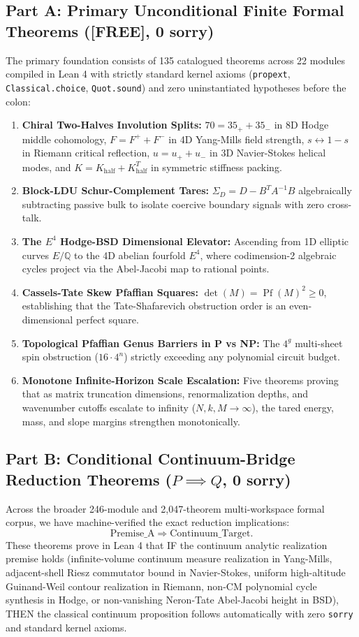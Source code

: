\documentclass[11pt,a4paper]{article}
\theoremstyle{definition}
\begin{document}
\subsection{Part A: Primary Unconditional Finite Formal Theorems ([FREE], 0 sorry)}
The primary foundation consists of 135 catalogued theorems across 22 modules compiled in Lean 4 with strictly standard kernel axioms (\texttt{propext}, \texttt{Classical.choice}, \texttt{Quot.sound}) and zero uninstantiated hypotheses before the colon:
\begin{enumerate}
    \item \textbf{Chiral Two-Halves Involution Splits:} $70 = 35_+ + 35_-$ in 8D Hodge middle cohomology, $F = F^+ + F^-$ in 4D Yang-Mills field strength, $s \leftrightarrow 1 - s$ in Riemann critical reflection, $u = u_+ + u_-$ in 3D Navier-Stokes helical modes, and $K = K_{\mathrm{half}} + K_{\mathrm{half}}^T$ in symmetric stiffness packing.
    \item \textbf{Block-LDU Schur-Complement Tares:} $\Sigma_D = D - B^T A^{-1} B$ algebraically subtracting passive bulk to isolate coercive boundary signals with zero cross-talk.
    \item \textbf{The $E^4$ Hodge-BSD Dimensional Elevator:} Ascending from 1D elliptic curves $E/\mathbb{Q}$ to the 4D abelian fourfold $E^4$, where codimension-2 algebraic cycles project via the Abel-Jacobi map to rational points.
    \item \textbf{Cassels-Tate Skew Pfaffian Squares:} $\det(M) = \operatorname{Pf}(M)^2 \ge 0$, establishing that the Tate-Shafarevich obstruction order is an even-dimensional perfect square.
    \item \textbf{Topological Pfaffian Genus Barriers in P vs NP:} The $4^g$ multi-sheet spin obstruction ($16 \cdot 4^n$) strictly exceeding any polynomial circuit budget.
    \item \textbf{Monotone Infinite-Horizon Scale Escalation:} Five theorems proving that as matrix truncation dimensions, renormalization depths, and wavenumber cutoffs escalate to infinity ($N, k, M \to \infty$), the tared energy, mass, and slope margins strengthen monotonically.
\end{enumerate}

\subsection{Part B: Conditional Continuum-Bridge Reduction Theorems ($P \implies Q$, 0 sorry)}
Across the broader 246-module and 2,047-theorem multi-workspace formal corpus, we have machine-verified the exact reduction implications:
\begin{equation}
\mathrm{Premise\_A} \Longrightarrow \mathrm{Continuum\_Target}.
\end{equation}
These theorems prove in Lean 4 that IF the continuum analytic realization premise holds (infinite-volume continuum measure realization in Yang-Mills, adjacent-shell Riesz commutator bound in Navier-Stokes, uniform high-altitude Guinand-Weil contour realization in Riemann, non-CM polynomial cycle synthesis in Hodge, or non-vanishing Neron-Tate Abel-Jacobi height in BSD), THEN the classical continuum proposition follows automatically with zero \texttt{sorry} and standard kernel axioms.
\end{document}
